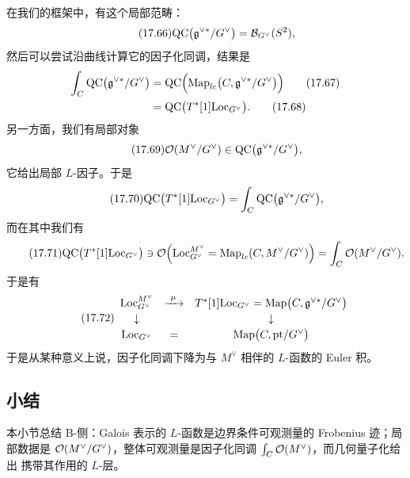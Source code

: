 在我们的框架中，有这个局部范畴：
\begin{equation}\tag{17.66}\label{eq:17.66}
\mathrm{QC}\bigl(\mathfrak g^{\vee*}/G^{\vee}\bigr)=\mathcal B_{G^{\vee}}(S^2),
\end{equation}
然后可以尝试沿曲线计算它的因子化同调，结果是
\begin{align}
\int_C\mathrm{QC}\bigl(\mathfrak g^{\vee*}/G^{\vee}\bigr)
&=\mathrm{QC}\Bigl(\operatorname{Map}_{lc}\bigl(C,\mathfrak g^{\vee*}/G^{\vee}\bigr)\Bigr)\tag{17.67}\label{eq:17.67}\\
&=\mathrm{QC}\bigl(T^*[1]\mathrm{Loc}_{G^{\vee}}\bigr).\tag{17.68}\label{eq:17.68}
\end{align}
另一方面，我们有局部对象
\begin{equation}\tag{17.69}\label{eq:17.69}
\mathcal{O}(M^{\vee}/G^{\vee})\in\mathrm{QC}\bigl(\mathfrak g^{\vee*}/G^{\vee}\bigr),
\end{equation}
它给出局部 $L$-因子。于是
\begin{equation}\tag{17.70}\label{eq:17.70}
\mathrm{QC}\bigl(T^*[1]\mathrm{Loc}_{G^{\vee}}\bigr)=\int_C\mathrm{QC}\bigl(\mathfrak g^{\vee*}/G^{\vee}\bigr),
\end{equation}
而在其中我们有
\begin{equation}\tag{17.71}\label{eq:17.71}
\mathrm{QC}\bigl(T^*[1]\mathrm{Loc}_{G^{\vee}}\bigr)\ni
\mathcal{O}\Bigl(\mathrm{Loc}^{M^{\vee}}_{G^{\vee}}=\operatorname{Map}_{lc}(C,M^{\vee}/G^{\vee})\Bigr)
=\int_C\mathcal{O}(M^{\vee}/G^{\vee}).
\end{equation}
于是有
\begin{equation}\tag{17.72}\label{eq:17.72}
\begin{array}{ccc}
\mathrm{Loc}^{M^{\vee}}_{G^{\vee}} & \xrightarrow{\ \mu\ } & T^*[1]\mathrm{Loc}_{G^{\vee}}
=\operatorname{Map}\bigl(C,\mathfrak g^{\vee*}/G^{\vee}\bigr)\\[2pt]
\downarrow & & \downarrow\\[2pt]
\mathrm{Loc}_{G^{\vee}} & = & \operatorname{Map}\bigl(C,\mathrm{pt}/G^{\vee}\bigr)
\end{array}
\end{equation}
于是从某种意义上说，因子化同调下降为与 $M^{\vee}$ 相伴的 $L$-函数的 Euler 积。

\subsection{小结}

\begin{sectionkey}
本小节总结 B-侧：Galois 表示的 $L$-函数是边界条件可观测量的 Frobenius 迹；局部数据是
$\mathcal{O}(M^{\vee}/G^{\vee})$，整体可观测量是因子化同调 $\int_C\mathcal{O}(M^{\vee})$，而几何量子化给出
携带其作用的 $L$-层。
\end{sectionkey}

